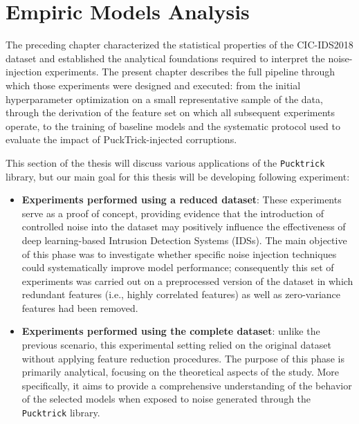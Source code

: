 \documentclass[../main.tex]{subfiles}
\begin{document}
\chapter{Empiric Models Analysis}
\label{chap:5-Empiric-analysis-models}

The preceding chapter characterized the statistical properties of the CIC-IDS2018\supercite{cicids2018Official} dataset and established the analytical foundations required to interpret the noise-injection experiments.  The present chapter describes the full pipeline through which those experiments were designed and executed: from the initial hyperparameter optimization on a small representative sample of the data, through the derivation of the feature set on which all subsequent experiments operate, to the training of baseline models and the systematic protocol used to evaluate the impact of PuckTrick-injected corruptions.

This section of the thesis will discuss various applications of the \texttt{Pucktrick} library, but our main goal for this thesis will be developing following experiment: 
\begin{itemize}
    \item {} \textbf{Experiments performed using a reduced dataset}: These experiments serve as a proof of concept, providing evidence that the introduction of controlled noise into the dataset may positively influence the effectiveness of deep learning-based Intrusion Detection Systems (IDSs). The main objective of this phase was to investigate whether specific noise injection techniques could systematically improve model performance; consequently this set of experiments was carried out on a preprocessed version of the dataset in which redundant features (i.e., highly correlated features) as well as zero-variance features had been removed. 

    \item {} \textbf{Experiments performed using the complete dataset}: unlike the previous scenario, this experimental setting relied on the original dataset without applying feature reduction procedures. The purpose of this phase is primarily analytical, focusing on the theoretical aspects of the study. More specifically, it aims to provide a comprehensive understanding of the behavior of the selected models when exposed to noise generated through the \texttt{Pucktrick} library.
\end{itemize}
\end{document}
